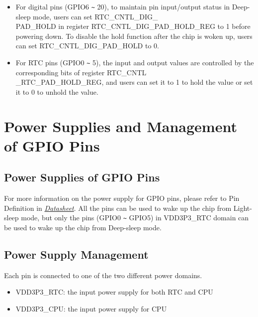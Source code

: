 \documentclass[main\_\_EN.tex]{subfiles}
\begin{document}
\begin{tiplisting}
\vspace{-2em}
\begin{itemize}
\item For digital pins (GPIO6 \verb+~+ 20), to maintain pin input/output status in Deep-sleep mode, users can set RTC\_CNTL\_DIG\_\\PAD\_HOLD\regindex{[n]} in register RTC\_CNTL\_DIG\_PAD\_HOLD\_REG to 1 before powering down. To disable the hold function after the chip is woken up, users can set RTC\_CNTL\_DIG\_PAD\_HOLD\regindex{[n]} to 0.

\item For RTC pins (GPIO0 \verb+~+ 5), the input and output values are controlled by the corresponding bits of register RTC\_CNTL\\\_RTC\_PAD\_HOLD\_REG, and users can set it to 1 to hold the value or set it to 0 to unhold the value.
\end{itemize}
\end{tiplisting}


\section{Power Supplies and Management of GPIO Pins}\label{I/O Pad Power Supplies}

\subsection{Power Supplies of GPIO Pins}
For more information on the power supply for GPIO pins, please refer to Pin Definition in {\it{\href{https://www.espressif.com/sites/default/files/documentation/esp8684_datasheet_en.pdf}{\chipname{} Datasheet}}}. All the pins can be used to wake up the chip from Light-sleep mode, but only the pins (GPIO0 \verb+~+ GPIO5) in VDD3P3\_RTC domain can be used to wake up the chip from Deep-sleep mode.

\subsection{Power Supply Management}

Each \chipname{} pin is connected to one of the two different power domains.

\begin{itemize}
    \item VDD3P3\_RTC: the input power supply for both RTC and CPU
    \item VDD3P3\_CPU: the input power supply for CPU
\end{itemize}
\end{document}
